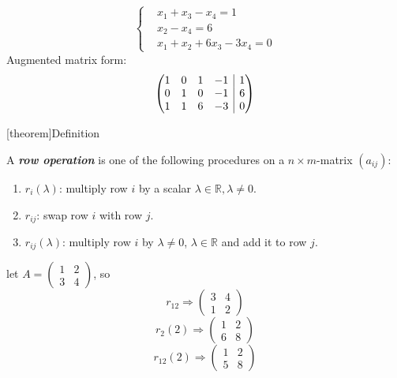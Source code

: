 \documentclass[12pt]{report}
\theoremstyle{definition}
\begin{document}
\begin{ex}
    \[\left\{
        \begin{align*}
            & x_1 + x_3 - x_4 = 1 \\
            & x_2 - x_4 = 6 \\
            & x_1 + x_2 + 6x_3 - 3x_4 = 0
        \end{align*}
     \right.   
    \]
    Augmented matrix form:\[
        \left(\begin{array}{@{}cccc|c@{}}%
                1 & 0 & 1 & -1 & 1 \\
                0 & 1 & 0 & -1 & 6 \\
                1 & 1 & 6 & -3 & 0
        \end{array}\right)
    \]
\end{ex}

[theorem]{Definition}
\begin{row operation}
    A \textbf{\emph{row operation}} is one of the following procedures on a $n \times m$-matrix $(a_{ij})$:
    \begin{enumerate}[label = (\arabic*)]
        \item $r_i(\lambda)$: multiply row $i$ by a scalar $\lambda \in \mathbb{R}, \lambda \neq 0$.
        \item $r_{ij}$: swap row $i$ with row $j$.
        \item $r_{ij}(\lambda)$: multiply row $i$ by $\lambda \neq 0$, $\lambda \in \mathbb{R}$ and add it to row $j$.
    \end{enumerate}
\end{row operation}

\begin{ex}
    let $A = \begin{pmatrix}
        1 & 2 \\
        3 & 4
    \end{pmatrix} $, so\[
        r_{12} \Rightarrow \begin{pmatrix}
            3 & 4 \\ 
            1 & 2
        \end{pmatrix} 
    \]\[
    r_2(2) \Rightarrow \begin{pmatrix}
        1 & 2\\
        6 & 8
    \end{pmatrix} 
    \]\[
    r_{12}(2) \Rightarrow \begin{pmatrix}
        1 & 2 \\
        5 & 8
    \end{pmatrix} 
    \]
\end{ex}
\end{document}
